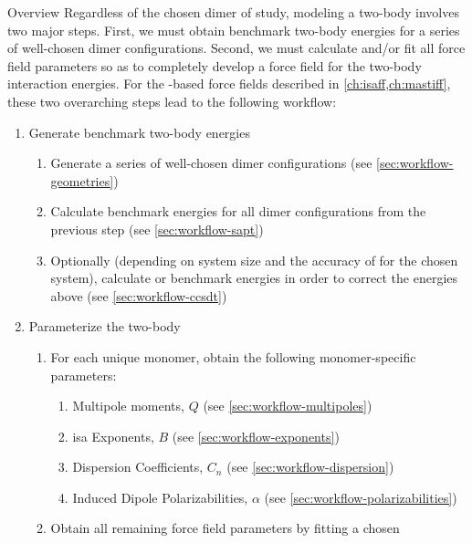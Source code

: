 \begin{section}{Overview}
Regardless of the chosen dimer of study, modeling a 
two-body \pes involves two major steps.  First, we must
obtain benchmark two-body energies for a series of well-chosen dimer
configurations. Second, we must
calculate and/or fit all force field parameters so as to completely develop a
force field for the two-body interaction energies. For the \sapt-based force fields described in
\cref{ch:isaff,ch:mastiff}, 
these two overarching steps lead to the following workflow:

%
\begin{minipage}{\linewidth}
\begin{enumerate}[label=\Roman*)]
\item Generate benchmark two-body energies
\label{workflow:step1}
    \begin{enumerate}[label=\arabic*)]
    \item Generate a series of well-chosen dimer configurations
        (see \cref{sec:workflow-geometries})
    \item Calculate \dftsapt benchmark energies for all dimer configurations from
the previous step
        (see \cref{sec:workflow-sapt})
    \item Optionally (depending on system size and the accuracy of \dftsapt
for the chosen system), calculate \ccsdt or \ccsdtf benchmark energies in
order to correct the \dftsapt energies above
        (see \cref{sec:workflow-ccsdt})
    \end{enumerate}
\item Parameterize the two-body \pes
\label{workflow:step2}
    \begin{enumerate}[label=\arabic*)]
    \item For each unique monomer, obtain the following monomer-specific parameters:
        \begin{enumerate}
        \item Multipole moments, $Q$
            (see \cref{sec:workflow-multipoles})
        \item \acrshort{isa} Exponents, $B$ 
            (see \cref{sec:workflow-exponents})
        \item Dispersion Coefficients, $C_n$
            (see \cref{sec:workflow-dispersion})
        \item Induced Dipole Polarizabilities, $\alpha$
            (see \cref{sec:workflow-polarizabilities})
        \end{enumerate}
    \item Obtain all remaining force field parameters by fitting a chosen

\end{enumerate}
\end{enumerate}
\end{minipage}
\end{section}

